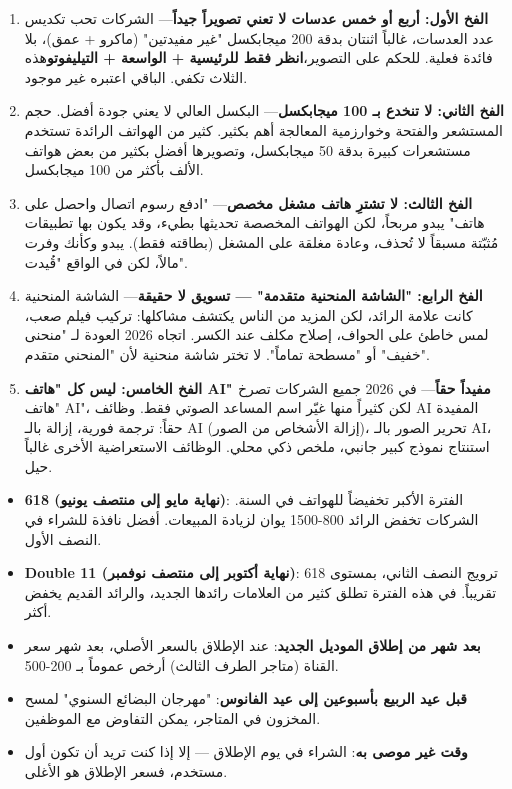 \begin{enumerate}
  \item \textbf{الفخ الأول: أربع أو خمس عدسات لا تعني تصويراً جيداً}— الشركات تحب تكديس عدد العدسات، غالباً اثنتان بدقة 200 ميجابكسل "غير مفيدتين" (ماكرو + عمق)، بلا فائدة فعلية. للحكم على التصوير،\textbf{انظر فقط للرئيسية + الواسعة + التيليفوتو}هذه الثلاث تكفي. الباقي اعتبره غير موجود.
  \item \textbf{الفخ الثاني: لا تنخدع بـ 100 ميجابكسل}— البكسل العالي لا يعني جودة أفضل. حجم المستشعر والفتحة وخوارزمية المعالجة أهم بكثير. كثير من الهواتف الرائدة تستخدم مستشعرات كبيرة بدقة 50 ميجابكسل، وتصويرها أفضل بكثير من بعض هواتف الألف بأكثر من 100 ميجابكسل.
  \item \textbf{الفخ الثالث: لا تشترِ هاتف مشغل مخصص}— "ادفع رسوم اتصال واحصل على هاتف" يبدو مربحاً، لكن الهواتف المخصصة تحديثها بطيء، وقد يكون بها تطبيقات مُثبّتة مسبقاً لا تُحذف، وعادة مغلقة على المشغل (بطاقته فقط). يبدو وكأنك وفرت مالاً، لكن في الواقع "قُيدت".
  \item \textbf{الفخ الرابع: "الشاشة المنحنية متقدمة" — تسويق لا حقيقة}— الشاشة المنحنية كانت علامة الرائد، لكن المزيد من الناس يكتشف مشاكلها: تركيب فيلم صعب، لمس خاطئ على الحواف، إصلاح مكلف عند الكسر. اتجاه 2026 العودة لـ "منحنى خفيف" أو "مسطحة تماماً". لا تختر شاشة منحنية لأن "المنحني متقدم".
  \item \textbf{الفخ الخامس: ليس كل "هاتف AI" مفيداً حقاً}— في 2026 جميع الشركات تصرخ "هاتف AI"، لكن كثيراً منها غيّر اسم المساعد الصوتي فقط. وظائف AI المفيدة حقاً: ترجمة فورية، إزالة بالـ AI (إزالة الأشخاص من الصور)، تحرير الصور بالـ AI، استنتاج نموذج كبير جانبي، ملخص ذكي محلي. الوظائف الاستعراضية الأخرى غالباً حيل.
\end{enumerate}


\begin{itemize}
  \item \textbf{618 (نهاية مايو إلى منتصف يونيو)}: الفترة الأكبر تخفيضاً للهواتف في السنة. الشركات تخفض الرائد 800-1500 يوان لزيادة المبيعات. أفضل نافذة للشراء في النصف الأول.
  \item \textbf{Double 11 (نهاية أكتوبر إلى منتصف نوفمبر)}: ترويج النصف الثاني، بمستوى 618 تقريباً. في هذه الفترة تطلق كثير من العلامات رائدها الجديد، والرائد القديم يخفض أكثر.
  \item \textbf{بعد شهر من إطلاق الموديل الجديد}: عند الإطلاق بالسعر الأصلي، بعد شهر سعر القناة (متاجر الطرف الثالث) أرخص عموماً بـ 200-500.
  \item \textbf{قبل عيد الربيع بأسبوعين إلى عيد الفانوس}: "مهرجان البضائع السنوي" لمسح المخزون في المتاجر، يمكن التفاوض مع الموظفين.
  \item \textbf{وقت غير موصى به}: الشراء في يوم الإطلاق — إلا إذا كنت تريد أن تكون أول مستخدم، فسعر الإطلاق هو الأغلى.
\end{itemize}

